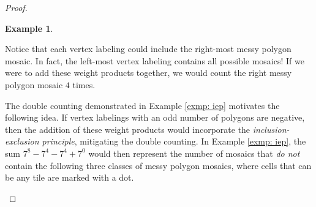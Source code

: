 \documentclass[12pt]{article}
\theoremstyle{plain}
\theoremstyle{definition}
\theoremstyle{remark}
\theoremstyle{definition}
\newtheorem{exmp}{Example}[section]
\newcommand{\cellopen}[4]{ \draw[thick] ( #1 , #2 ) rectangle ( #3 , #4 ); \node[shape=circle,draw=red,fill=red, inner sep=0pt,minimum size=3pt] (A) at ( #1 * 0.5 + #3 * 0.5 , #2 * 0.5 + #4 * 0.5 ){};}
\newcommand{\cellA}[4]{\draw[red, thick, densely dotted] ( #1 + 0.5 , #2 ) arc(0:90:{0.5}); \draw[thick] ( #1 , #2 ) rectangle ( #3 , #4 );}
\newcommand{\cellB}[4]{\draw[red, thick, densely dotted] ( #1 + 1 , #2 + 0.5 ) arc(90:180:{0.5}); \draw[thick] ( #1 , #2 ) rectangle ( #3 , #4 );}
\newcommand{\cellC}[4]{\draw[red, thick, densely dotted] ( #1 + 0.5, #2 + 1 ) arc(180:270:{0.5}); \draw[thick] ( #1 , #2 ) rectangle ( #3 , #4 );}
\newcommand{\cellD}[4]{\draw[red, thick, densely dotted] ( #1 , #2 + 0.5 ) arc(-90:0:{0.5}); \draw[thick] ( #1 , #2 ) rectangle ( #3 , #4 );}
\newcommand{\lablnode}[3]{\node[shape=circle,draw=none,fill=none, inner sep=0pt,minimum size=5pt] (A) at ( #1 , #2 ) {#3};}
\newcommand{\lablvertex}[3]{\node[shape=circle,draw=none,fill=white, inner sep=2pt,minimum size=5pt] (A) at ( #1 , #2 ) {#3};}
\begin{document}
\begin{proof}
\begin{exmp}
\begin{center}
\end{center}

Notice that each vertex labeling could include the right-most messy polygon mosaic. In fact, the left-most vertex labeling contains all possible mosaics! If we were to add these weight products together, we would count the right messy polygon mosaic $4$ times.

\end{exmp}

The double counting demonstrated in Example \ref{exmp: iep} motivates the following idea. If vertex labelings with an odd number of polygons are negative, then the addition of these weight products would incorporate the \textit{inclusion-exclusion principle}, mitigating the double counting. In Example \ref{exmp: iep}, the sum $7^8 - 7^4 - 7^4 + 7^0$ would then represent the number of mosaics that \textit{do not} contain the following three classes of messy polygon mosaics, where cells that can be any tile are marked with a dot.

\begin{center}
\end{center}
\end{proof}
\end{document}
